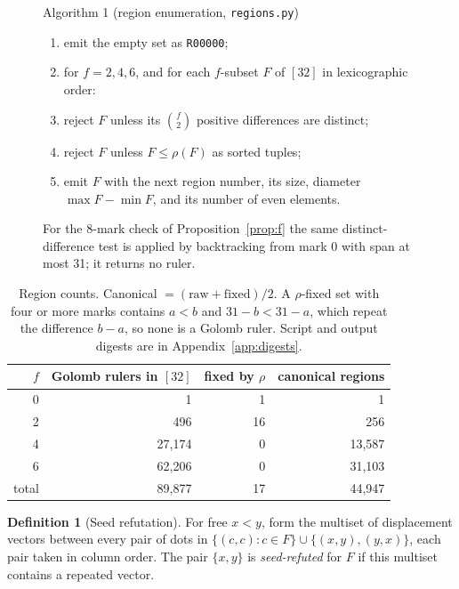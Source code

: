 \documentclass[11pt,a4paper]{article}
\theoremstyle{definition}
\newtheorem{definition}[theorem]{Definition}
\newcommand{\code}[1]{\texttt{#1}}
\begin{document}
\begin{figure}[H]
\centering
\begin{minipage}{0.9\linewidth}
\small
Algorithm 1 (region enumeration, \code{regions.py})\label{alg:enum}
\begin{enumerate}[nosep, label=\arabic*.]
\item emit the empty set as \code{R00000};
\item for $f=2,4,6$, and for each $f$-subset $F$ of $[32]$ in lexicographic order:
\item \quad reject $F$ unless its $\binom{f}{2}$ positive differences are distinct;
\item \quad reject $F$ unless $F\le\rho(F)$ as sorted tuples;
\item \quad emit $F$ with the next region number, its size, diameter $\max F-\min F$, and
its number of even elements.
\end{enumerate}
For the 8-mark check of Proposition~\ref{prop:f} the same distinct-difference test is applied
by backtracking from mark 0 with span at most 31; it returns no ruler.
\end{minipage}
\end{figure}

\begin{table}[H]
\centering
\begin{tabular}{@{}rrrr@{}}
\toprule
$f$ & Golomb rulers in $[32]$ & fixed by $\rho$ & canonical regions \\
\midrule
0 & 1 & 1 & 1 \\
2 & 496 & 16 & 256 \\
4 & 27{,}174 & 0 & 13{,}587 \\
6 & 62{,}206 & 0 & 31{,}103 \\
\midrule
total & 89{,}877 & 17 & 44{,}947 \\
\bottomrule
\end{tabular}
\caption{Region counts. Canonical $=(\text{raw}+\text{fixed})/2$. A $\rho$-fixed set with
four or more marks contains $a<b$ and $31-b<31-a$, which repeat the difference $b-a$, so
none is a Golomb ruler. Script and output digests are in Appendix~\ref{app:digests}.}
\label{tab:regions}
\end{table}

\begin{definition}[Seed refutation]\label{def:seed}
For free $x<y$, form the multiset of displacement vectors between every pair of dots in
$\{(c,c):c\in F\}\cup\{(x,y),(y,x)\}$, each pair taken in column order. The pair $\{x,y\}$ is
\emph{seed-refuted} for $F$ if this multiset contains a repeated vector.
\end{definition}
\end{document}
